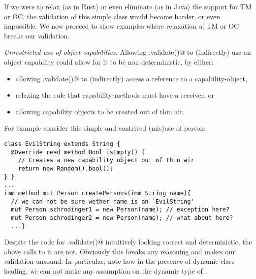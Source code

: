 
If we were to relax (as in Rust) or even eliminate (as in Java) the support for TM or OC, the validation of this simple \Q@Person@ class would become harder, or even impossible. We now proceed to show examples where
relaxation of TM or OC breaks our validation. 

\loseSpace
\noindent\textit{Unrestricted use of object-capabilities:}
Allowing \Q@.validate()@ to (indirectly) use an object capability could allow for it to be non deterministic, by either:
\begin{itemize}
\item allowing \Q@.validate()@ to (indirectly) access a \Q@mut@ reference to a capability-object,
\item relaxing the rule that capability-methods must have a \Q@mut@ receiver, or
\item allowing capability objects to be created out of thin air.
\end{itemize}

For example consider this simple and contrived (mis)use of person:
\begin{lstlisting}
class EvilString extends String {
  @Override read method Bool isEmpty() {
    // Creates a new capability object out of thin air
    return new Random().bool();
} }
...
imm method mut Person createPersons(imm String name){
  // we can not be sure wether name is an `EvilString'
  mut Person schrodinger1 = new Person(name); // exception here?
  mut Person schrodinger2 = new Person(name); // what about here?
  ...}
\end{lstlisting}
Despite the code for \Q@Persion.validate()@ intuitively looking correct and deterministic, the above calls to it are not. Obviously this breaks any reasoning and makes our validation unsound. 
In particular, note how in the presence of dynamic class loading, 
we can not make any assumption on the dynamic type of \Q@name@.

